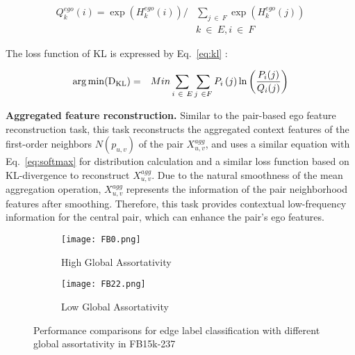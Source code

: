 \documentclass[10pt,journal,compsoc]{IEEEtran}
\DeclareMathOperator*{\argmin}{arg\,min}
\begin{document}
     
\begin{equation} 
    \begin{aligned}
    \label{eq:softmax}
Q_k^{ego}(i) =  \exp{\left(H^{ego}_k(i)\right)}  
      / & \sum_{j\ \in\ F}\exp{\left(H^{ego}_k(j)\right)} \\
      &  k\ \in\ E, i\ \in\ F
    \end{aligned}
    \end{equation}
    
    The loss function of KL is expressed by Eq.~\ref{eq:kl} :
    
\begin{equation}
\begin{aligned}
 \label{eq:kl}
\argmin & ({\rm D_{KL}}) = 
        &  Min\sum_{i\ \in\ E}\sum_{j\ \in F}{P_{i}\left(j\right)\ln\left(\frac{P_{i}(j)}{Q_i(j)}\right)}
\end{aligned}
\end{equation}

    


 \noindent\textbf{Aggregated feature reconstruction.}
 Similar to the pair-based ego feature reconstruction task, this task reconstructs the aggregated context features of the first-order neighbors $N(p_{u,v})$ of the pair $X_{u,v}^{agg}$, and uses a similar equation with Eq.~\ref{eq:softmax} for distribution calculation and a similar loss function based on KL-divergence to reconstruct $X_{u,v}^{agg}$. Due to the natural smoothness of the mean aggregation operation, $X_{u,v}^{agg}$ represents the information of the pair neighborhood features after smoothing. Therefore, this task provides contextual low-frequency information for the central pair, which can enhance the pair's ego features.
 


\begin{figure}[htb]
\centering
\begin{subfigure}{0.495\columnwidth}
\centering
\texttt{[image: FB0.png]}
\caption{High Global Assortativity}
\end{subfigure}
\begin{subfigure}{0.495\columnwidth}
\centering
\texttt{[image: FB22.png]}

 \caption{Low Global Assortativity}
\end{subfigure}
\caption{Performance comparisons for edge label classification with different global assortativity in FB15k-237}
\label{fig:ass_task}
\end{figure}
\end{document}
